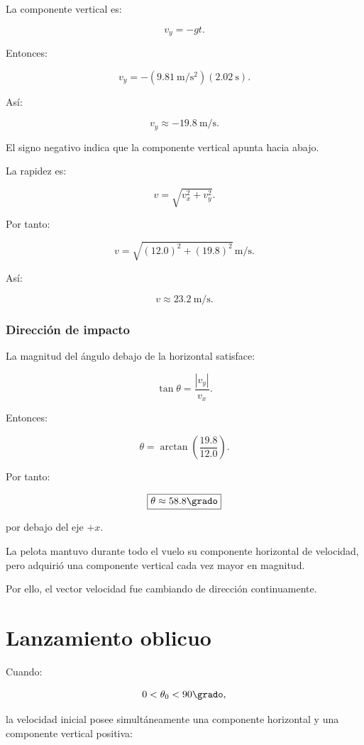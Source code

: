 La componente vertical es:

\[
v_y=-gt.
\]

Entonces:

\[
v_y
=
-
(\SI{9.81}{\meter\per\second\squared})
(\SI{2.02}{\second}).
\]

Así:

\[
\boxed{
v_y\approx-\SI{19.8}{\meter\per\second}
}.
\]

El signo negativo indica que la componente vertical apunta hacia abajo.

La rapidez es:

\[
v
=
\sqrt{v_x^2+v_y^2}.
\]

Por tanto:

\[
v
=
\sqrt{
(12.0)^2+(19.8)^2
}
\,
\si{\meter\per\second}.
\]

Así:

\[
\boxed{
v\approx\SI{23.2}{\meter\per\second}
}.
\]


\subsubsection*{Dirección de impacto}

La magnitud del ángulo debajo de la horizontal satisface:

\[
\tan\theta
=
\frac{|v_y|}{v_x}.
\]

Entonces:

\[
\theta
=
\arctan
\left(
\frac{19.8}{12.0}
\right).
\]

Por tanto:

\[
\boxed{
\theta\approx58.8\grado
}
\]

por debajo del eje \(+x\).

\begin{interpretacion}
La pelota mantuvo durante todo el vuelo su componente horizontal de velocidad,
pero adquirió una componente vertical cada vez mayor en magnitud.

Por ello, el vector velocidad fue cambiando de dirección continuamente.
\end{interpretacion}


\section{Lanzamiento oblicuo}

Cuando:

\[
0<\theta_0<90\grado,
\]

la velocidad inicial posee simultáneamente una componente horizontal y una
componente vertical positiva:

